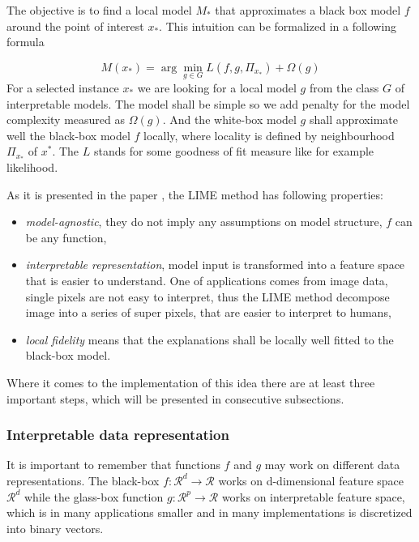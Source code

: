 \documentclass[12pt,]{krantz}
\providecommand{\tightlist}{%
  \setlength{\itemsep}{0pt}\setlength{\parskip}{0pt}}
\theoremstyle{definition}
\theoremstyle{definition}
\theoremstyle{definition}
\theoremstyle{remark}
\begin{document}
The objective is to find a local model \(M_{*}\) that approximates a
black box model \(f\) around the point of interest \(x_*\). This
intuition can be formalized in a following formula

\[
M(x_{*}) = \arg \min_{g \in G} L(f, g, \Pi_{x_*}) + \Omega (g) 
\] For a selected instance \(x_*\) we are looking for a local model
\(g\) from the class \(G\) of interpretable models. The model shall be
simple so we add penalty for the model complexity measured as
\(\Omega(g)\). And the white-box model \(g\) shall approximate well the
black-box model \(f\) locally, where locality is defined by
neighbourhood \(\Pi_{x_*}\) of \(x^*\). The \(L\) stands for some
goodness of fit measure like for example likelihood.

As it is presented in the paper \citep{lime}, the LIME method has
following properties:

\begin{itemize}
\tightlist
\item
  \emph{model-agnostic}, they do not imply any assumptions on model
  structure, \(f\) can be any function,
\item
  \emph{interpretable representation}, model input is transformed into a
  feature space that is easier to understand. One of applications comes
  from image data, single pixels are not easy to interpret, thus the
  LIME method decompose image into a series of super pixels, that are
  easier to interpret to humans,
\item
  \emph{local fidelity} means that the explanations shall be locally
  well fitted to the black-box model.
\end{itemize}

Where it comes to the implementation of this idea there are at least
three important steps, which will be presented in consecutive
subsections.

\hypertarget{interpretable-data-representation}{%
\subsubsection{Interpretable data
representation}\label{interpretable-data-representation}}

It is important to remember that functions \(f\) and \(g\) may work on
different data representations. The black-box
\(f:\mathcal R^d \rightarrow \mathcal R\) works on d-dimensional feature
space \(\mathcal R^d\) while the glass-box function
\(g:\mathcal R^p \rightarrow \mathcal R\) works on interpretable feature
space, which is in many applications smaller and in many implementations
is discretized into binary vectors.
\end{document}
